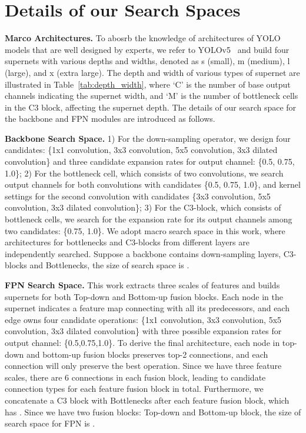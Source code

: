 \documentclass[letterpaper]{article} \usepackage{aaai22}  \usepackage{times}  \usepackage{helvet}  \usepackage{courier}  \usepackage[hyphens]{url}  \usepackage{graphicx} \urlstyle{rm} \def\UrlFont{\rm}  \usepackage{natbib}  \usepackage{caption} \DeclareCaptionStyle{ruled}{labelfont=normalfont,labelsep=colon,strut=off} \frenchspacing  \setlength{\pdfpagewidth}{8.5in}  \setlength{\pdfpageheight}{11in}
\begin{document}
\section{Details of our Search Spaces}
\textbf{Marco Architectures.}
To abosrb the knowledge of architectures of YOLO models that are well designed by experts, we refer to YOLOv5~\cite{yolov5} and build four supernets with various depths and widths, denoted as s (small), m (medium), l (large), and x (extra large). The depth and width of various types of supernet are illustrated in Table~\ref{tab:depth_width}, where `C' is the number of base output channels indicating the supernet width, and `M' is the number of bottleneck cells in the C3 block, affecting the supernet depth. The details of our search space for the backbone and FPN modules are introduced as follows.


\textbf{Backbone Search Space.}
1) For the down-sampling operator, we design
four candidates: \{1x1 convolution, 3x3 convolution, 5x5 convolution, 3x3 dilated convolution\} and three candidate expansion rates for output channel: \{0.5, 0.75, 1.0\};
2) For the bottleneck cell, which consists of two convolutions, we search output channels for both convolutions with candidates \{0.5, 0.75, 1.0\}, and kernel settings for the second convolution with candidates \{3x3 convolution, 5x5 convolution, 3x3 dilated convolution\};
3) For the C3-block, which consists of  bottleneck cells, we search for the expansion rate for its output channels among two candidates: \{0.75, 1.0\}.
We adopt macro search space in this work, where architectures for bottlenecks and C3-blocks from different layers are independently searched. 
Suppose a backbone contains  down-sampling layers,  C3-blocks and  Bottlenecks, the size of search space is . 


\textbf{FPN Search Space.}
This work extracts three scales of features and builds supernets for both Top-down and Bottom-up fusion blocks. Each node in the supernet indicates a feature map connecting with all its predecessors, and each edge owns four candidate operations: \{1x1 convolution, 3x3 convolution, 5x5 convolution, 3x3 dilated convolution\} with three possible expansion rates for output channel: \{0.5,0.75,1.0\}. To derive the final architecture, each node in top-down and bottom-up fusion blocks preserves top-2 connections, and each connection will only preserve the best operation. Since we have three feature scales, there are 6 connections in each fusion block, leading to  candidate connection types for each feature fusion block in total. 
Furthermore, we concatenate a C3 block with  Bottlenecks after each feature fusion block, which has .
Since we have two fusion blocks: Top-down and Bottom-up block, the size of search space for FPN is .
\end{document}
